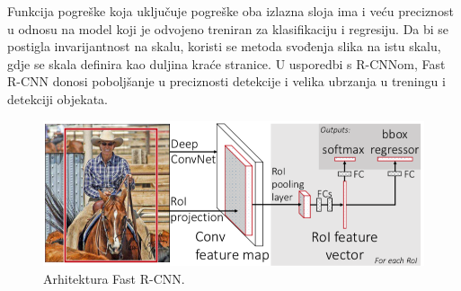 Funkcija pogreške koja uključuje pogreške oba izlazna sloja ima i veću preciznost u odnosu na model koji je odvojeno treniran za klasifikaciju i regresiju.
Da bi se postigla invarijantnost na skalu, koristi se metoda svođenja slika na istu skalu, gdje se skala definira kao duljina kraće stranice.
U usporedbi s R-CNNom, Fast R-CNN donosi poboljšanje u preciznosti detekcije i velika ubrzanja u treningu i detekciji objekata.

 \begin{figure}
	\centering
	\includegraphics[scale=1]{img/fast_rcnn.png}
	\caption{Arhitektura Fast R-CNN.}
	\label{fast_rcnn}
\end{figure}